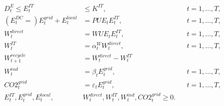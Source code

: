 \documentclass{article}
\begin{document}
\begin{align}
    D^{E}_t \leq E_t^{IT} &\leq K^{IT}, && t=1,\ldots,T, \\
   (E_t^{DC} =)E_t^{grid} + E_t^{local}  &= PUE_t E_t^{IT}, && t=1,\ldots,T, \\
    W_t^{direct} &= WUE_t E_t^{IT}, && t=1,\ldots,T, \\
    W_t^{IT} &= \alpha_t^W W_t^{direct}, && t=1,\ldots,T, \\
    W^{recycle}_{t+1} &= W_t^{direct} - W_t^{IT}  \\
    W_t^{ind} &= \beta_t E_t^{grid}, && t=1,\ldots,T, \\
    CO2_t^{grid} &= \varepsilon_t E_t^{grid} , && t=1,\ldots,T, \\
E_t^{IT},E_t^{grid},E_t^{local},&W_t^{direct},W_t^{IT},W_t^{ind},CO2_t^{grid} \geq 0.
\end{align}
\end{document}
